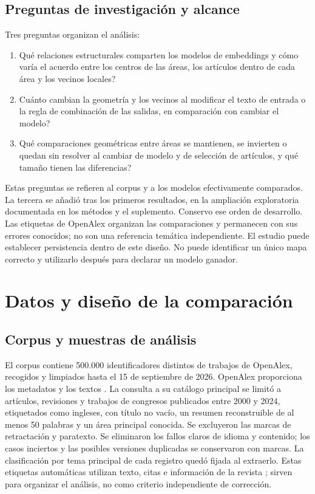 \documentclass[12pt]{article}
\begin{document}
\subsection{Preguntas de investigación y alcance}
Tres preguntas organizan el análisis:

\begin{enumerate}
\item[\textbf{PI1.}] \textquestiondown{}Qué relaciones estructurales comparten los modelos de embeddings y cómo varía el acuerdo entre los centros de las áreas, los artículos dentro de cada área y los vecinos locales?
\item[\textbf{PI2.}] \textquestiondown{}Cuánto cambian la geometría y los vecinos al modificar el texto de entrada o la regla de combinación de las salidas, en comparación con cambiar el modelo?
\item[\textbf{PI3.}] \textquestiondown{}Qué comparaciones geométricas entre áreas se mantienen, se invierten o quedan sin resolver al cambiar de modelo y de selección de artículos, y qué tamaño tienen las diferencias?
\end{enumerate}

Estas preguntas se refieren al corpus y a los modelos efectivamente comparados. La tercera se añadió tras los primeros resultados, en la ampliación exploratoria documentada en los métodos y el suplemento. Conservo ese orden de desarrollo. Las etiquetas de OpenAlex organizan las comparaciones y permanecen con sus errores conocidos; no son una referencia temática independiente. El estudio puede establecer persistencia dentro de este diseño. No puede identificar un único mapa correcto y utilizarlo después para declarar un modelo ganador.

\section{Datos y diseño de la comparación}
\subsection{Corpus y muestras de análisis}
El corpus contiene 500.000 identificadores distintos de trabajos de OpenAlex, recogidos y limpiados hasta el 15 de septiembre de 2026. OpenAlex proporciona los metadatos y los textos \citep{priem2022openalex}. La consulta a su catálogo principal se limitó a artículos, revisiones y trabajos de congresos publicados entre 2000 y 2024, etiquetados como ingleses, con título no vacío, un resumen reconstruible de al menos 50 palabras y un área principal conocida. Se excluyeron las marcas de retractación y paratexto. Se eliminaron los fallos claros de idioma y contenido; los casos inciertos y las posibles versiones duplicadas se conservaron con marcas. La clasificación por tema principal de cada registro quedó fijada al extraerlo. Estas etiquetas automáticas utilizan texto, citas e información de la revista \citep{openalex2026topics}; sirven para organizar el análisis, no como criterio independiente de corrección.
\end{document}
